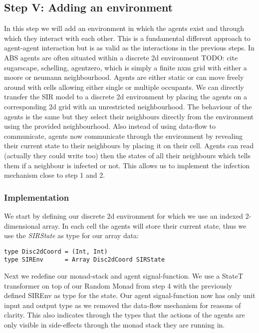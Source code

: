 \subsection{Step V: Adding an environment}
In this step we will add an environment in which the agents exist and through which they interact with each other. This is a fundamental different approach to agent-agent interaction but is as valid as the interactions in the previous steps.
In ABS agents are often situated within a discrete 2d environment TODO: cite sugarscape, schelling, agentzero, which is simply a finite nxm grid with either a moore or neumann neighbourhood. Agents are either static or can move freely around with cells allowing either single or multiple occupants. 
We can directly transfer the SIR model to a discrete 2d environment by placing the agents on a corresponding 2d grid with an unrestricted neighbourhood. The behaviour of the agents is the same but they select their neighbours directly from the environment using the provided neighbourhood. Also instead of using data-flow to communicate, agents now communicate through the environment by revealing their current state to their neighbours by placing it on their cell. Agents can read (actually they could write too) then the states of all their neighbours which tells them if a neighbour is infected or not. This allows us to implement the infection mechanism close to step 1 and 2.

\subsubsection{Implementation}
We start by defining our discrete 2d environment for which we use an indexed 2-dimensional array. In each cell the agents will store their current state, thus we use the \textit{SIRState} as type for our array data:

\begin{verbatim}
type Disc2dCoord = (Int, Int)
type SIREnv      = Array Disc2dCoord SIRState
\end{verbatim}

Next we redefine our monad-stack and agent signal-function. We use a StateT transformer on top of our Random Monad from step 4 with the previously defined SIREnv as type for the state. Our agent signal-function now has only unit input and output type as we removed the data-flow mechanism for reasons of clarity. This also indicates through the types that the actions of the agents are only visible in side-effects through the monad stack they are running in.

